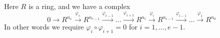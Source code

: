 \begin{situation}
\label{situation-complex}
Here $R$ is a ring, and we have a complex
$$
0
\to
R^{n_e}
\xrightarrow{\varphi_e}
R^{n_{e-1}}
\xrightarrow{\varphi_{e-1}}
\ldots
\xrightarrow{\varphi_{i + 1}}
R^{n_i}
\xrightarrow{\varphi_i}
R^{n_{i-1}}
\xrightarrow{\varphi_{i-1}}
\ldots
\xrightarrow{\varphi_1}
R^{n_0}
$$
In other words we require $\varphi_i \circ \varphi_{i + 1} = 0$
for $i = 1, \ldots, e - 1$.
\end{situation}